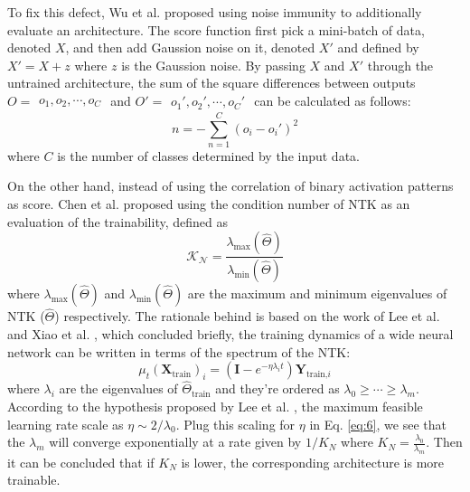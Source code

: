 \documentclass[sigconf]{acmart}
\begin{document}
    To fix this defect, Wu et al. proposed using noise immunity to additionally 
    evaluate an architecture. The score function first pick a mini-batch of data, 
    denoted $X$, and then add Gaussion noise on it, denoted $X'$ and defined by $X'=X+z$ 
    where $z$ is the Gaussion noise. By passing $X$ and $X'$ through the untrained 
    architecture, the sum of the square differences between outputs 
    $O=\begin{matrix}o_1,o_2,\cdots,o_C\end{matrix}$ and 
    $O'=\begin{matrix}o_1',o_2',\cdots,o_C'\end{matrix}$ can be calculated as 
    follows:
    \begin{equation}
        n=-\sum^C_{n=1}(o_i-o_i')^2
    \end{equation}
    where $C$ is the number of classes determined by the input data.
    
    On the other hand, instead of using the correlation of binary activation 
    patterns as score. Chen et al. proposed using the condition number of NTK 
    as an evaluation of the trainability, defined as
    \begin{equation}
        \mathcal{K_N}=\frac{\lambda_{\textrm{max}}(\hat\Theta)}{\lambda_{\textrm{min}}(\hat\Theta)}
    \end{equation}
    where $\lambda_{\textrm{max}}(\hat\Theta)$ and $\lambda_{\textrm{min}}(\hat\Theta)$ 
    are the maximum and minimum eigenvalues of NTK ($\hat\Theta$) respectively.
    The rationale behind is based on the work of Lee et al. \cite{Lee_2020} and 
    Xiao et al. \cite{https://doi.org/10.48550/arxiv.1912.13053}, which concluded briefly, 
    the training dynamics of a wide neural network can be written in terms of the 
    spectrum of the NTK:
    \begin{equation}\label{eq:6}
        \mu_t(\textbf{X}_{\textrm{train}})_i=(\textbf{I}-e^{-\eta\lambda_it})\textbf{Y}_{\textrm{train,}i}
    \end{equation}
    where $\lambda_i$ are the eigenvalues of $\hat\Theta_{\textrm{train}}$ 
    and they're ordered as $\lambda_0\geq\cdots\geq\lambda_m$. 
    According to the hypothesis proposed by Lee et al. \cite{Lee_2020}, the maximum 
    feasible learning rate scale as $\eta\sim2/\lambda_0$. Plug this scaling for 
    $\eta$ in Eq. \ref{eq:6}, we see that the $\lambda_m$ will converge exponentially 
    at a rate given by $1/K_N$ where $K_N=\frac{\lambda_0}{\lambda_m}$.
    Then it can be concluded that if $K_N$ is lower, the corresponding architecture is 
    more trainable.

    
    
\end{document}
